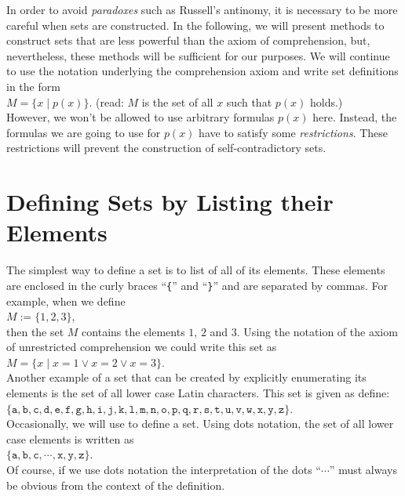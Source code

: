 In order to avoid \emph{paradoxes} such as Russell's antinomy, it is necessary to be more careful when sets are
constructed.  In the following, we will present methods to construct sets that are less powerful than the 
axiom of comprehension, but, nevertheless, these methods will be sufficient for our purposes.  We will continue
to use the notation underlying the comprehension axiom and write set definitions in the form
\\[0.2cm]
\hspace*{1.3cm}
$M = \{ x \mid p(x) \}$. \qquad (read: $M$ is the set of all $x$ such that $p(x)$ holds.)  
\\[0.2cm]
However, we won't be allowed to use arbitrary formulas $p(x)$ here.  Instead, the formulas we are going to use
for $p(x)$ have to satisfy some \emph{restrictions}.  These restrictions will prevent the construction of
self-contradictory sets.


\section{Defining Sets by Listing their Elements}
The simplest way to define a set is to list of all of its elements. These elements are enclosed in the
curly braces  ``\texttt{\{}'' and ``\texttt{\}}'' and are separated by commas.
For example, when we define \\[0.2cm]
\hspace*{1.3cm} $M := \{ 1, 2, 3 \}$, \\[0.2cm]
then the set $M$ contains the elements $1$, $2$ and $3$.
Using  the notation of the axiom of unrestricted comprehension we could write this set as \\[0.2cm]
\hspace*{1.3cm} 
$M = \{ x \mid x = 1 \vee x = 2 \vee x = 3 \}$.
\\[0.2cm]
Another example of a set that can be created by explicitly enumerating its elements
is the set of all lower case Latin characters.  This set is given as
define: \\[0.2cm]
\hspace*{1.3cm} 
$\{\mathtt{a}, \mathtt{b}, \mathtt{c}, \mathtt{d}, \mathtt{e},
 \mathtt{f}, \mathtt{g}, \mathtt{h}, \mathtt{i}, \mathtt{j}, \mathtt{k}, \mathtt{l},
 \mathtt{m}, \mathtt{n}, \mathtt{o}, \mathtt{p}, \mathtt{q}, \mathtt{r}, \mathtt{s},
 \mathtt{t}, \mathtt{u}, \mathtt{v}, \mathtt{w}, \mathtt{x}, \mathtt{y}, \mathtt{z}\}$.
 \\[0.2cm]
Occasionally, we will use  to define a set.  Using dots notation, the set of all lower case
elements is written as
\\[0.2cm]
\hspace*{1.3cm}
$\{ \mathtt{a}, \mathtt{b}, \mathtt{c}, \cdots, \mathtt{x}, \mathtt{y}, \mathtt{z}\} $.
\\[0.2cm]
Of course, if we use dots notation the interpretation of the dots ``$\cdots$'' must always be obvious from the
context of the definition. 

